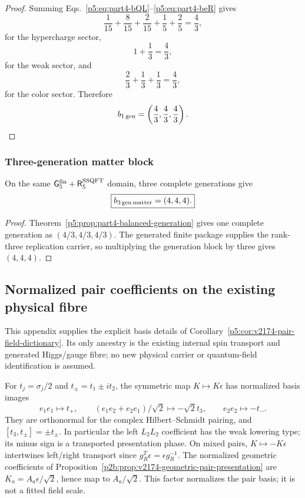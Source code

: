 \documentclass[11pt,a4paper]{article}
\begin{document}
\begin{proof}
Summing Eqs.~\eqref{p5:eq:part4-bQL}--\eqref{p5:eq:part4-beR} gives
\[
\frac{1}{15}+\frac{8}{15}+\frac{2}{15}+\frac15+\frac25=\frac43,
\]
for the hypercharge sector,
\[
1+\frac13=\frac43,
\]
for the weak sector, and
\[
\frac23+\frac13+\frac13=\frac43,
\]
for the color sector. Therefore
\[
b_{\rm 1\,gen}=\left(\frac43,\frac43,\frac43\right).
\]
\end{proof}

\subsubsection{Three-generation matter block}
\begin{corollary}
\label{p5:cor:part4-three-generation-matter}
On the same
\(\mathsf G_5^{\rm fin}
+\mathsf R_5^{\rm SSQFT}\) domain, three complete generations give
\begin{equation}
\label{p5:eq:part4-three-generation-matter}
\boxed{b_{\rm 3\,gen\,matter}=(4,4,4).}
\end{equation}
\end{corollary}

\begin{proof}
Theorem~\ref{p5:prop:part4-balanced-generation} gives one complete generation
as \((4/3,4/3,4/3)\).  The generated finite package supplies the rank-three
replication carrier, so multiplying the generation block by three gives
\((4,4,4)\).
\end{proof}

\subsection{Normalized pair coefficients on the existing physical fibre}
\label{p5:app:v2174-field-coefficient-dictionary}
This appendix supplies the explicit basis details of
Corollary~\ref{p5:cor:v2174-pair-field-dictionary}. Its only ancestry is
the existing internal spin transport and generated Higgs/gauge fibre; no
new physical carrier or quantum-field identification is assumed.

For $t_j=\sigma_j/2$ and $t_\pm=t_1\pm it_2$, the symmetric map
$K\mapsto K\epsilon$ has normalized basis images
\[
 e_1e_1\mapsto t_+,\qquad
 (e_1e_2+e_2e_1)/\sqrt2\mapsto-\sqrt2t_3,\qquad
 e_2e_2\mapsto-t_-.
\]
They are orthonormal for the complex Hilbert--Schmidt pairing, and
$[t_3,t_\pm]=\pm t_\pm$. In particular the left $L_2L_2$ coefficient
has the weak lowering type; its minus sign is a transported presentation
phase. On mixed pairs, $K\mapsto-K\epsilon$ intertwines left/right
transport since $g_R^T\epsilon=\epsilon g_R^{-1}$.
The normalized geometric coefficients of
Proposition~\ref{p2b:prop:v2174-geometric-pair-presentation} are
$K_a=A_a\epsilon/\sqrt2$, hence map to $A_a/\sqrt2$.
This factor normalizes the pair basis; it is not a fitted field scale.
\end{document}
